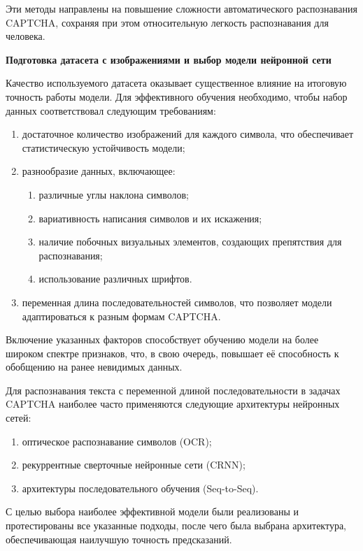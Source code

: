 Эти методы направлены на повышение сложности автоматического распознавания 
CAPTCHA, сохраняя при этом относительную легкость распознавания для человека. 

\textbf{Подготовка датасета с изображениями и выбор модели нейронной сети}

Качество используемого датасета оказывает существенное влияние на итоговую 
точность работы модели. Для эффективного обучения необходимо, чтобы набор данных 
соответствовал следующим требованиям:

\begin{enumerate}
    \item достаточное количество изображений для каждого символа, что 
    обеспечивает статистическую устойчивость модели;
    \item разнообразие данных, включающее:
    \begin{enumerate}
        \item различные углы наклона символов;
        \item вариативность написания символов и их искажения;
        \item наличие побочных визуальных элементов, создающих препятствия для 
        распознавания;
        \item использование различных шрифтов.
    \end{enumerate}
    \item переменная длина последовательностей символов, что позволяет модели 
    адаптироваться к разным формам CAPTCHA.
\end{enumerate}

Включение указанных факторов способствует обучению модели на более широком 
спектре признаков, что, в свою очередь, повышает её способность к обобщению на 
ранее невидимых данных.

Для распознавания текста с переменной длиной последовательности в задачах CAPTCHA 
наиболее часто применяются следующие архитектуры нейронных сетей:

\begin{enumerate}
    \item оптическое распознавание символов (OCR);
    \item рекуррентные сверточные нейронные сети (CRNN);
    \item архитектуры последовательного обучения (Seq-to-Seq).
\end{enumerate}

С целью выбора наиболее эффективной модели были реализованы и протестированы все 
указанные подходы, после чего была выбрана архитектура, обеспечивающая наилучшую 
точность предсказаний.

